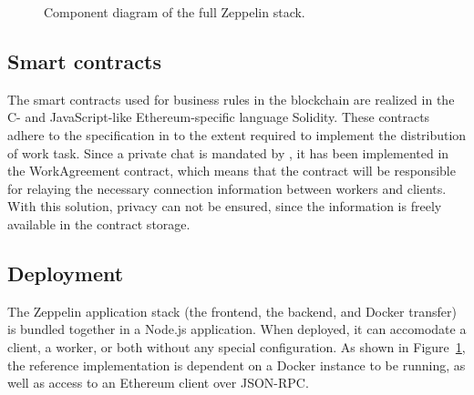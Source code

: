 \begin{figure}[ht]
\centering
{}
\caption{Component diagram of the full Zeppelin stack.}
\label{zep-stack}
\end{figure}

\subsection{Smart contracts}
The smart contracts used for business rules in the blockchain are realized in the C- and JavaScript-like Ethereum-specific language Solidity. These contracts adhere to the specification in  to the extent required to implement the distribution of work task. Since a private chat is mandated by , it has been implemented in the WorkAgreement contract, which means that the contract will be responsible for relaying the necessary connection information between workers and clients. With this solution, privacy can not be ensured, since the information is freely available in the contract storage.


\subsection{Deployment}
The Zeppelin application stack (the frontend, the backend, and Docker transfer) is bundled together in a Node.js application. When deployed, it can accomodate a client, a worker, or both without any special configuration. As shown in Figure~\ref{zep-stack}, the reference implementation is dependent on a Docker instance to be running, as well as access to an Ethereum client over JSON-RPC.
